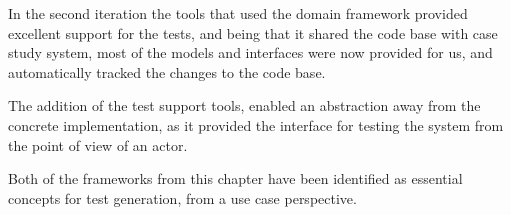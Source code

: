 \noindent In the second iteration the tools that used the domain framework provided excellent support for the tests, and being that it shared the code base with case study system, most of the models and interfaces were now provided for us, and automatically tracked the changes to the code base.\medskip

\noindent The addition of the test support tools, enabled an abstraction away from the concrete implementation, as it provided the interface for testing the system from the point of view of an actor.\medskip

\noindent Both of the frameworks from this chapter have been identified as essential concepts for test generation, from a use case perspective.
